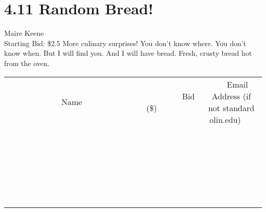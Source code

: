 \documentclass[11pt]{article}
\begin{document}
\section*{4.11 Random Bread!}
Maire Keene
\\
Starting Bid: \$2.5
\newline
More culinary surprises!
You don't know where.
You don't know when.
But I will find you.
And I will have bread.
Fresh, crusty bread hot from the oven.
\\[6ex]
\begin{tabular}{c c c}
~~~~~~~~~~~~~Name~~~~~~~~~~~~~ & ~~~~~~~~~Bid (\$)~~~~~~~~~  & ~~~Email Address (if not standard olin.edu)~~~\\
 & & \\
\hline
 & & \\
\hline
 & & \\
\hline
 & & \\
\hline
 & & \\
\hline
 & & \\
\hline
 & & \\
\hline
 & & \\
\hline
 & & \\
\hline
 & & \\
\hline
 & & \\
\hline
 & & \\
\hline
 & & \\
\hline
 & & \\
\hline
 & & \\
\hline
 & & \\
\hline
 & & \\
\hline
 & & \\
\hline
 & & \\
\hline
 & & \\
\hline
 & & \\
\hline
 & & \\
\hline
 & & \\
\hline
 & & \\
\hline
 & & \\
\hline
 & & \\
\hline
\end{tabular}
\newpage
\end{document}
